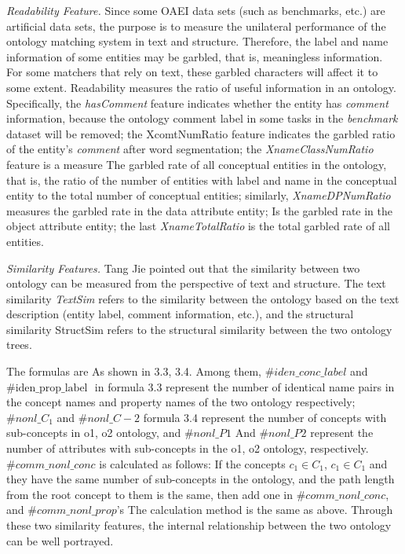 \documentclass[twoside]{article}
\begin{document}
{\it Readability Feature.} Since some OAEI data sets (such as benchmarks, etc.) are artificial data sets, the purpose is to measure the unilateral performance of the ontology matching system in text and structure.
Therefore, the label and name information of some entities may be garbled, that is, meaningless information.
For some matchers that rely on text, these garbled characters will affect it to some extent.
Readability measures the ratio of useful information in an ontology.
Specifically, the {\it hasComment} feature indicates whether the entity has {\it comment} information, because the ontology comment label in some tasks in the {\it benchmark} dataset will be removed; the XcomtNumRatio feature indicates the garbled ratio of the entity's {\it comment} after word segmentation; the {\it XnameClassNumRatio} feature is a measure The garbled rate of all conceptual entities in the ontology, that is, the ratio of the number of entities with label and name in the conceptual entity to the total number of conceptual entities; similarly, {\it XnameDPNumRatio} measures the garbled rate in the data attribute entity; Is the garbled rate in the object attribute entity; the last {\it XnameTotalRatio} is the total garbled rate of all entities.

{\it Similarity Features.} Tang Jie\cite{tyz74} pointed out that the similarity between two ontology can be measured from the perspective of text and structure. The text similarity {\it TextSim} refers to the similarity between the ontology based on the text description (entity label, comment information, etc.), and the structural similarity StructSim refers to the structural similarity between the two ontology trees.

The formulas are As shown in 3.3, 3.4.
Among them, ${\#iden\_conc\_label}$ and $\text{\#iden\_prop\_label }$ in formula 3.3 represent the number of identical name pairs in the concept names and property names of the two ontology respectively;
$\# nonl\_C_{1}$ and $\# nonl\_C-{2}$ formula 3.4 represent the number of concepts with sub-concepts in o1, o2 ontology,
and $\# nonl\_P1$ And $\# nonl\_P2$ represent the number of attributes with sub-concepts in the o1, o2 ontology, respectively.
$\#comm\_nonl\_conc$ is calculated as follows:
If the concepts $c_{1} \in C_{1}$, $c_{1} \in C_{1}$ and they have the same number of sub-concepts in the ontology, and the path length from the root concept to them is the same,
then add one in $\#comm\_nonl\_conc$, and $\#comm\_nonl\_prop$'s The calculation method is the same as above.
Through these two similarity features, the internal relationship between the two ontology can be well portrayed.
\end{document}
